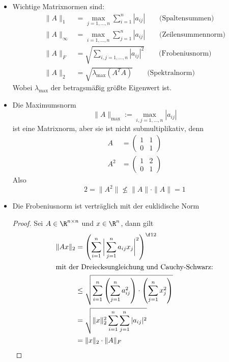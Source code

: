 \documentclass{mycourse}
\begin{document}
\begin{ex}

\begin{itemize}
\item
	Wichtige Matrixnormen sind:
\label{ex:2.11}
\begin{align*}
\|A\|_1 &= \max_{j=1,\dotsc,n}\sum_{i=1}^n|a_{ij}| \qquad \text{(Spaltensummen)}\\
\|A\|_\infty &= \max_{i=1,\dotsc,n}\sum_{j=1}^n|a_{ij}| \qquad \text{(Zeilensummennorm)}\\
\|A\|_F &= \sqrt{\sum_{i,j=1,\dotsc,n}|a_{ij}|^2} \qquad \text{(Frobeniusnorm)}\\ 
\|A\|_2 &= \sqrt{\lambda_{\text{max}}(A^TA)} \qquad \text{(Spektralnorm)}
\end{align*}
Wobei $\lambda_{\text{max}}$ der betragsmäßig größte Eigenwert ist.

\item
	Die Maximumsnorm
\[
	\|A\|_{\text{max}}:=\max_{i,j=1,\dotsc,n}|a_{ij}| 
\]
ist eine Matrixnorm, aber sie ist nicht submultiplikativ, denn
\begin{align*}
A&=\begin{pmatrix}1&1\\0&1\end{pmatrix}\\
A^2&=\begin{pmatrix}1&2\\0&1\end{pmatrix}
\end{align*}
Also
\[
2=\|A^2\|\not\le \|A\|\cdot\|A\|=1
\]

\item
Die Frobeniusnorm ist verträglich mit der euklidische Norm
\begin{proof}
	Sei $A\in \R^{n\times n}$ und $x\in \R^n$, dann gilt
	\begin{align*}
		\|Ax\|_2&=\left(\sum_{i=1}^n\bigg|\sum_{j=1}^na_{ij}x_j\bigg|^2\right)^{\f 12}\\
		\intertext{mit der Dreiecksungleichung und Cauchy-Schwarz:}
		&\le \sqrt{\sum_{i=1}^n\left(\sum_{j=1}^na_{ij}^2\right)\cdot\left(\sum_{j=1}^nx_j^2\right)}\\
		&=\sqrt{\|x\|_2^2\sum_{i=1}^n\sum_{j=1}^n|a_{ij}|^2}\\
		&= \|x\|_2\cdot \|A\|_F 
	\end{align*}
\end{proof}
\end{itemize}
\end{ex}
\end{document}
